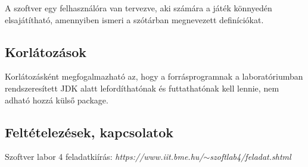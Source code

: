 A szoftver egy felhasználóra van tervezve, aki számára a játék könnyedén elsajátítható, amennyiben ismeri a szótárban megnevezett definíciókat.

\subsection{Korlátozások}

Korlátozásként megfogalmazható az, hogy a forrásprogramnak a laboratóriumban rendszeresített JDK alatt lefordíthatónak és futtathatónak kell lennie, nem adható hozzá külső package.

\subsection{Feltételezések, kapcsolatok}

Szoftver labor 4 feladatkiírás: \textit{https://www.iit.bme.hu/$\sim$szoftlab4/feladat.shtml}
